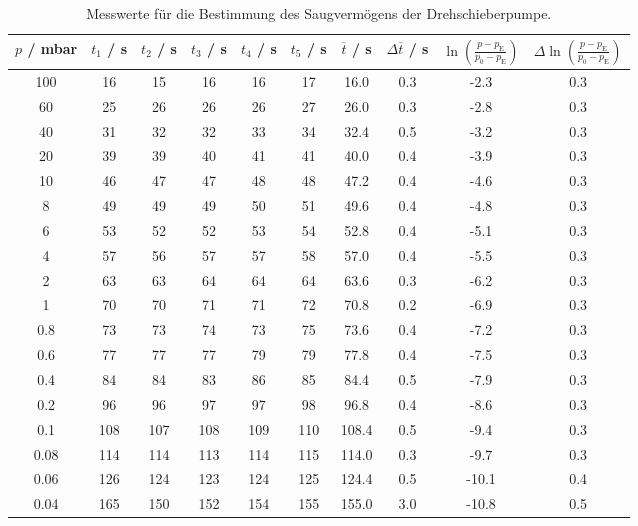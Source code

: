 \begin{table}[H] %
  \centering
  \caption{Messwerte für die Bestimmung des Saugvermögens der Drehschieberpumpe.}
  \label{tab:ptdreh}
  \begin{tabular}{c|c|c|c|c|c|c|c|c|c}
    $p$ / mbar & $t_1$ / s & $t_2$ / s & $t_3$ / s & $t_4$ / s & $t_5$ / s & $\overline{t}$ / s & $\Delta \overline{t}$ / s & $\ln\left( \frac{p-p_\text{E}}{p_0-p_\text{E}} \right)$ & $\Delta \ln\left( \frac{p-p_\text{E}}{p_0-p_\text{E}} \right)$ \\
    \midrule
    100  & 16  & 15  & 16  & 16  & 17  & 16.0  & 0.3 & -2.3  & 0.3 \\
    60   & 25  & 26  & 26  & 26  & 27  & 26.0  & 0.3 & -2.8  & 0.3 \\
    40   & 31  & 32  & 32  & 33  & 34  & 32.4  & 0.5 & -3.2  & 0.3 \\
    \hline
    20   & 39  & 39  & 40  & 41  & 41  & 40.0  & 0.4 & -3.9  & 0.3 \\
    10   & 46  & 47  & 47  & 48  & 48  & 47.2  & 0.4 & -4.6  & 0.3 \\
    8    & 49  & 49  & 49  & 50  & 51  & 49.6  & 0.4 & -4.8  & 0.3 \\
    6    & 53  & 52  & 52  & 53  & 54  & 52.8  & 0.4 & -5.1  & 0.3 \\
    4    & 57  & 56  & 57  & 57  & 58  & 57.0  & 0.4 & -5.5  & 0.3 \\
    2    & 63  & 63  & 64  & 64  & 64  & 63.6  & 0.3 & -6.2  & 0.3 \\
    \hline
    1    & 70  & 70  & 71  & 71  & 72  & 70.8  & 0.2 & -6.9  & 0.3 \\
    0.8  & 73  & 73  & 74  & 73  & 75  & 73.6  & 0.4 & -7.2  & 0.3 \\
    0.6  & 77  & 77  & 77  & 79  & 79  & 77.8  & 0.4 & -7.5  & 0.3 \\
    0.4  & 84  & 84  & 83  & 86  & 85  & 84.4  & 0.5 & -7.9  & 0.3 \\
    0.2  & 96  & 96  & 97  & 97  & 98  & 96.8  & 0.4 & -8.6  & 0.3 \\
    \hline
    0.1  & 108 & 107 & 108 & 109 & 110 & 108.4 & 0.5 & -9.4  & 0.3 \\
    0.08 & 114 & 114 & 113 & 114 & 115 & 114.0 & 0.3 & -9.7  & 0.3 \\
    0.06 & 126 & 124 & 123 & 124 & 125 & 124.4 & 0.5 & -10.1 & 0.4 \\
    0.04 & 165 & 150 & 152 & 154 & 155 & 155.0 & 3.0 & -10.8 & 0.5 \\
  \end{tabular}
\end{table}

